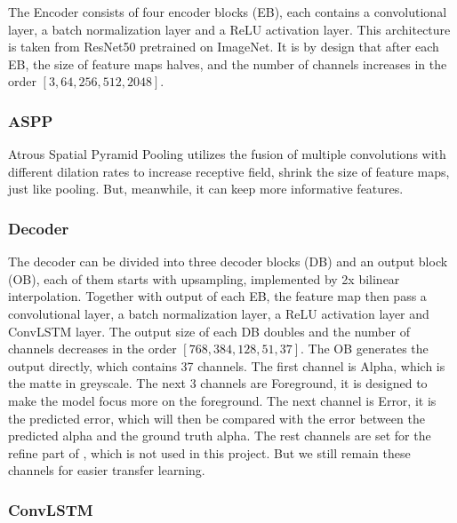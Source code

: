 \documentclass[final]{cvpr}
\begin{document}
The Encoder consists of four encoder blocks (EB), each contains a convolutional layer, a batch normalization layer and a ReLU activation layer.
This architecture is taken from ResNet50 pretrained on ImageNet.
It is by design that after each EB, the size of feature maps halves, and the number of channels increases in the order $[3, 64, 256, 512, 2048]$.

\subsubsection{ASPP}

Atrous Spatial Pyramid Pooling utilizes the fusion of multiple convolutions with different dilation rates to increase receptive field, shrink the size of feature maps, just like pooling.
But, meanwhile, it can keep more informative features.

\subsubsection{Decoder}

The decoder can be divided into three decoder blocks (DB) and an output block (OB), each of them starts with upsampling, implemented by 2x bilinear interpolation.
Together with output of each EB, the feature map then pass a convolutional layer, a batch normalization layer, a ReLU activation layer and ConvLSTM layer.
The output size of each DB doubles and the number of channels decreases in the order  $[768, 384, 128, 51, 37]$.
The OB generates the output directly, which contains 37 channels.
The first channel is Alpha, which is the matte in greyscale.
The next 3 channels are Foreground, it is designed to make the model focus more on the foreground.
The next channel is Error, it is the predicted error, which will then be compared with the error between the predicted alpha and the ground truth alpha.
The rest channels are set for the refine part of \cite{linRealTimeHighResolutionBackground2020a}, which is not used in this project.
But we still remain these channels for easier transfer learning.

\subsubsection{ConvLSTM}
\end{document}
